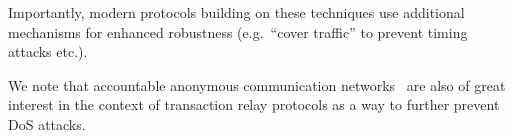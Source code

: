 Importantly, modern protocols building on these techniques use additional mechanisms for enhanced robustness (e.g.~``cover traffic'' to prevent timing attacks etc.).

\begin{remark}
    We note that accountable anonymous communication networks~\cite{DBLP:books/sp/07/DiazP07} are also of great interest in the context of transaction relay protocols as a way to further prevent DoS attacks.
\end{remark}
